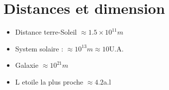 \documentclass[12pt]{book}
\begin{document}
        \section{Distances et dimension}
            \begin{itemize}
                \item Distance terre-Soleil $ \approx 1.5\times 10^{11} m $
                \item System solaire : $ \approx 10^{13} m \approx 10$U.A.
                \item Galaxie $ \approx 10^{21}m $
                \item L etoile la plus proche $ \approx 4.2 $a.l
            \end{itemize}
\end{document}
